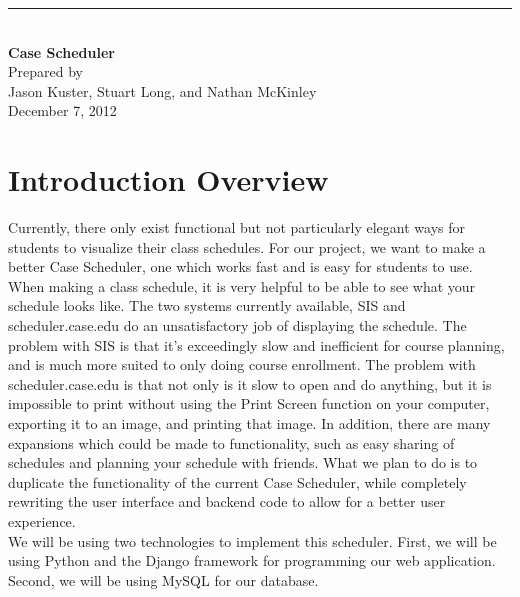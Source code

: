 \documentclass[pdftex,12pt,letter]{article}
\newcommand{\HRule}{\rule{\linewidth}{0.5mm}}
\begin{document}
\begin{titlepage}
\begin{flushright}
\HRule \\
{\huge \bfseries Case Scheduler\\[4cm]}
{\large Prepared by\\Jason Kuster, Stuart Long, and Nathan McKinley\\[1cm]
December 7, 2012}
\end{flushright}
\end{titlepage}
\tableofcontents{}
\newpage
\section{Introduction Overview}
Currently, there only exist functional but not particularly elegant ways for students to visualize their class schedules. For our project, we want to make a better Case Scheduler, one which works fast and is easy for students to use.\\

\noindent When making a class schedule, it is very helpful to be able to see what your schedule looks like. The two systems currently available, SIS and scheduler.case.edu do an unsatisfactory job of displaying the schedule. The problem with SIS is that it's exceedingly slow and inefficient for course planning, and is much more suited to only doing course enrollment. The problem with scheduler.case.edu is that not only is it slow to open and do anything, but it is impossible to print without using the Print Screen function on your computer, exporting it to an image, and printing that image. In addition, there are many expansions which could be made to functionality, such as easy sharing of schedules and planning your schedule with friends. What we plan to do is to duplicate the functionality of the current Case Scheduler, while completely rewriting the user interface and backend code to allow for a better user experience.\\

\noindent We will be using two technologies to implement this scheduler. First, we will be using Python and the Django framework for programming our web application. Second, we will be using MySQL for our database.
\end{document}
